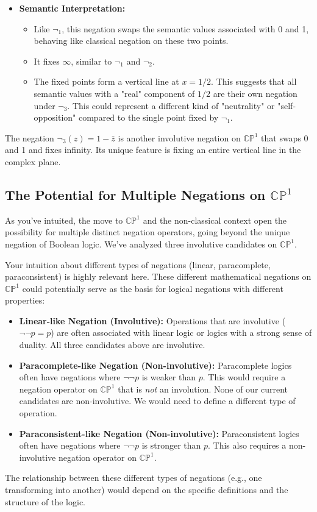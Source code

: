 \begin{itemize}
		\item \textbf{Semantic Interpretation:}
		\begin{itemize}
			\item Like $\neg_1$, this negation swaps the semantic values associated with 0 and 1, behaving like classical negation on these two points.
			\item It fixes $\infty$, similar to $\neg_1$ and $\neg_2$.
			\item The fixed points form a vertical line at $x = 1/2$. This suggests that all semantic values with a "real" component of $1/2$ are their own negation under $\neg_3$. This could represent a different kind of "neutrality" or "self-opposition" compared to the single point fixed by $\neg_1$.
		\end{itemize}
	\end{itemize}
	The negation $\neg_3(z) = 1 - \bar{z}$ is another involutive negation on $\mathbb{CP}^1$ that swaps 0 and 1 and fixes infinity. Its unique feature is fixing an entire vertical line in the complex plane.
	
	\subsection{The Potential for Multiple Negations on $\mathbb{CP}^1$}
	
	As you've intuited, the move to $\mathbb{CP}^1$ and the non-classical context open the possibility for multiple distinct negation operators, going beyond the unique negation of Boolean logic. We've analyzed three involutive candidates on $\mathbb{CP}^1$.
	
	Your intuition about different types of negations (linear, paracomplete, paraconsistent) is highly relevant here. These different mathematical negations on $\mathbb{CP}^1$ could potentially serve as the basis for logical negations with different properties:
	
	\begin{itemize}
		\item \textbf{Linear-like Negation (Involutive):} Operations that are involutive ($\neg\neg p = p$) are often associated with linear logic or logics with a strong sense of duality. All three candidates above are involutive.
		
		\item \textbf{Paracomplete-like Negation (Non-involutive):} Paracomplete logics often have negations where $\neg\neg p$ is weaker than $p$. This would require a negation operator on $\mathbb{CP}^1$ that is \textit{not} an involution. None of our current candidates are non-involutive. We would need to define a different type of operation.
		
		\item \textbf{Paraconsistent-like Negation (Non-involutive):} Paraconsistent logics often have negations where $\neg\neg p$ is stronger than $p$. This also requires a non-involutive negation operator on $\mathbb{CP}^1$.
	\end{itemize}
	The relationship between these different types of negations (e.g., one transforming into another) would depend on the specific definitions and the structure of the logic.
	
